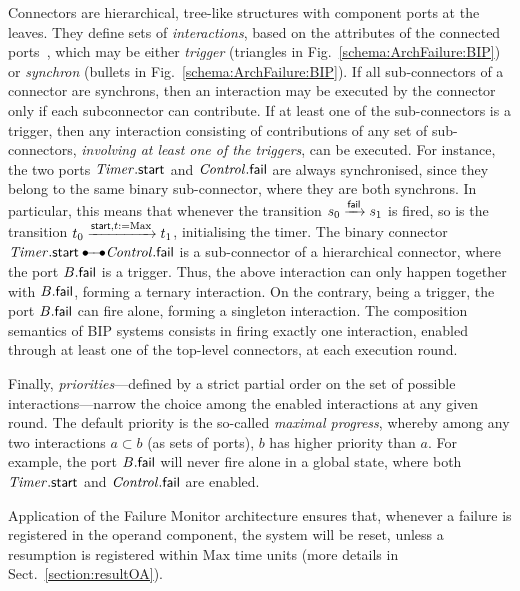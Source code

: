 \documentclass{lncs/llncs}
\newcommand{\mdash}{---}
\newcommand{\goesto}[2][]{\ensuremath{\xrightarrow[#1]{#2}}}
\begin{document}
Connectors are hierarchical, tree-like structures with component ports
at the leaves.  They define sets of \emph{interactions}, based on the
attributes of the connected ports~\cite{BliSif08-acp-tc}, which may be
either \emph{trigger} (triangles in Fig.~\ref{schema:ArchFailure:BIP})
or \emph{synchron} (bullets in Fig.~\ref{schema:ArchFailure:BIP}).
%
If all sub-connectors of a connector are synchrons, then an
interaction may be executed by the connector only if each subconnector
can contribute.
%
If at least one of the sub-connectors is a trigger, then any
interaction consisting of contributions of any set of sub-connectors,
\emph{involving at least one of the triggers}, can be executed.
%
For instance, the two ports $\mathit{Timer}.\mathsf{start}$ and
$\mathit{Control}.\mathsf{fail}$ are always synchronised, since they belong to
the same binary sub-connector, where they are both synchrons.  In
particular, this means that whenever the transition $\cstate{0}
\goesto{\PortFail} \cstate{1}$ is fired, so is the transition
$\tstate{0} \goesto{\PortStart, \TimerInit[]} \tstate{1}$,
initialising the timer.  The binary connector $\NameTimer.\PortStart
\bullet\!\!\!-\!\!\!-\!\!\!\bullet \NameCtrl.\PortFail$ is a
sub-connector of a hierarchical connector, where the port
$B.\mathsf{fail}$ is a trigger.  Thus, the above interaction can
only happen together with $B.\mathsf{fail}$, forming a
ternary interaction.  On the contrary, being a trigger, the port
$B.\mathsf{fail}$ can fire alone, forming a singleton
interaction.  The composition semantics of BIP systems consists in
firing exactly one interaction, enabled through at least one of the
top-level connectors, at each execution round.

Finally, \emph{priorities}\mdash defined by a strict partial order on
the set of possible interactions\mdash narrow the choice among the
enabled interactions at any given round.  The default priority is the
so-called \emph{maximal progress}, whereby among any two interactions
$a \subset b$ (as sets of ports), $b$ has higher priority than $a$.
For example, the port $B.\mathsf{fail}$ will never fire alone in
a global state, where both $\mathit{Timer}.\mathsf{start}$ and
$\mathit{Control}.\mathsf{fail}$ are enabled.
%


Application of the Failure Monitor architecture ensures that, whenever
a failure is registered in the operand component, the system will be
reset, unless a resumption is registered within $\mathrm{Max}$ time
units (more details in Sect.~\ref{section:resultOA}).
\end{document}
